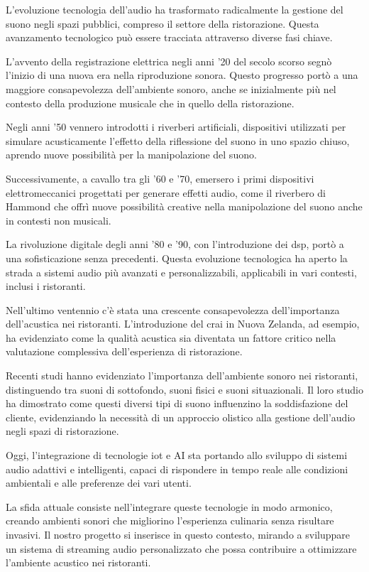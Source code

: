 L'evoluzione tecnologia dell’audio ha trasformato radicalmente la gestione del suono negli spazi pubblici, compreso il settore della ristorazione. Questa avanzamento tecnologico può essere tracciata attraverso diverse fasi chiave.

L’avvento della registrazione elettrica negli anni '20 del secolo scorso segnò l'inizio di una nuova era nella riproduzione sonora. Questo progresso portò a una maggiore consapevolezza dell'ambiente sonoro, anche se inizialmente più nel contesto della produzione musicale che in quello della ristorazione.

Negli anni '50 vennero introdotti i riverberi artificiali, dispositivi utilizzati per simulare acusticamente l'effetto della riflessione del suono in uno spazio chiuso, aprendo nuove possibilità per la manipolazione del suono.

Successivamente, a cavallo tra gli '60 e '70, emersero i primi dispositivi elettromeccanici progettati per generare effetti audio, come il riverbero di Hammond che offrì nuove possibilità creative nella manipolazione del suono anche in contesti non musicali.

La rivoluzione digitale degli anni '80 e '90, con l'introduzione dei  \gls{dsp}, portò a una sofisticazione senza precedenti. Questa evoluzione tecnologica ha aperto la strada a sistemi audio più avanzati e personalizzabili, applicabili in vari contesti, inclusi i ristoranti.

Nell'ultimo ventennio c'è stata una crescente consapevolezza dell'importanza dell'acustica nei ristoranti. L'introduzione del \gls{crai} in Nuova Zelanda, ad esempio, ha evidenziato come la qualità acustica sia diventata un fattore critico nella valutazione complessiva dell'esperienza di ristorazione.

Recenti studi hanno evidenziato l'importanza dell'ambiente sonoro nei ristoranti, distinguendo tra suoni di sottofondo, suoni fisici e suoni situazionali. Il loro studio ha dimostrato come questi diversi tipi di suono influenzino la soddisfazione del cliente, evidenziando la necessità di un approccio olistico alla gestione dell'audio negli spazi di ristorazione.

Oggi, l'integrazione di tecnologie \gls{iot} e AI sta portando allo sviluppo di sistemi audio adattivi e intelligenti, capaci di rispondere in tempo reale alle condizioni ambientali e alle preferenze dei vari utenti. 

La sfida attuale consiste nell'integrare queste tecnologie in modo armonico, creando ambienti sonori che migliorino l'esperienza culinaria senza risultare invasivi. Il nostro progetto si inserisce in questo contesto, mirando a sviluppare un sistema di streaming audio personalizzato che possa contribuire a ottimizzare l'ambiente acustico nei ristoranti.

